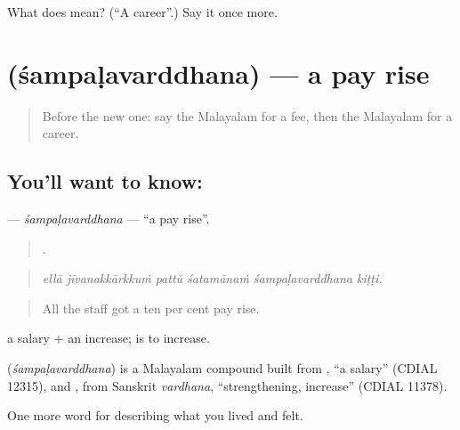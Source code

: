 \begin{tcolorbox}[breakable,colback=teal!4,colframe=teal!35!black,title={Before you move on}]
What does  mean? (\textquotedblleft{}A career\textquotedblright{}.) Say it once more.
\end{tcolorbox}
\section[\texorpdfstring{\ml{ശമ്പളവർദ്ധന} (śampaḷavarddhana)}{ശമ്പളവർദ്ധന (śampaḷavarddhana)}]{ (śampaḷavarddhana) — a pay rise}

\label{lesson:ML-C549-sampalavarddhana}



\begin{quote}
Before the new one: say the Malayalam for a fee, then the Malayalam for a career.
\end{quote}

\subsection*{You'll want to know: }
\textbf{} — \emph{śampaḷavarddhana} — \textquotedblleft{}a pay rise\textquotedblright{}.

\begin{quote}
     .
\end{quote}

\begin{quote}
\emph{ellā jīvanakkārkkuṁ pattŭ śatamānaṁ śampaḷavarddhana kiṭṭi.}
\end{quote}

\begin{quote}
All the staff got a ten per cent pay rise.
\end{quote}

 a salary +  an increase;  is to increase.

\begin{cousinweb}
\textbf{} (\emph{śampaḷavarddhana}) is a Malayalam compound built from , \textquotedblleft{}a salary\textquotedblright{} (CDIAL 12315), and , from Sanskrit \emph{vardhana}, \textquotedblleft{}strengthening, increase\textquotedblright{} (CDIAL 11378).
\end{cousinweb}

\begin{grammarlens}[title={What you've built}]
One more word for describing what you lived and felt.
\end{grammarlens}

